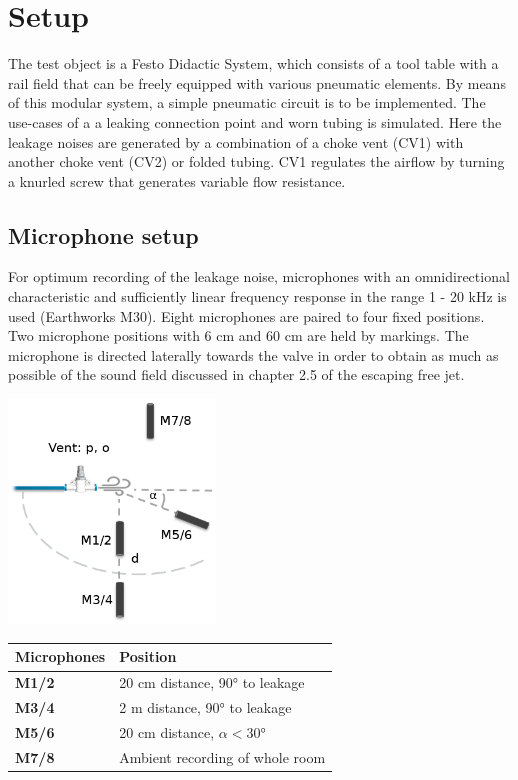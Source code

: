 \documentclass[a4paper,12pt]{article}
\begin{document}
\section{Setup}

The test object is a Festo Didactic System, which consists of a tool table with a rail field that can be freely equipped with various pneumatic elements. By means of this modular system, a simple pneumatic circuit is to be implemented. The use-cases of a a leaking connection point and worn tubing is simulated. Here the leakage noises are generated by a combination of a choke vent (CV1) with another choke vent (CV2) or folded tubing. CV1 regulates the airflow by turning a knurled screw that generates variable flow resistance. 

\subsection{Microphone setup}

For optimum recording of the leakage noise, microphones with an omnidirectional characteristic and sufficiently linear frequency response in the range 1 - 20 kHz is used (Earthworks M30). Eight microphones are paired to four fixed positions.  Two microphone positions with 6 cm and 60 cm are held by markings. The microphone is directed laterally towards the valve in order to obtain as much as possible of the sound field discussed in chapter 2.5 of the escaping free jet.

 \begin{minipage}{\textwidth}
  \begin{minipage}[b]{0.49\textwidth}
    \centering
    \includegraphics[width=55mm]{images/mic_positions_scheme.png}
  \end{minipage}
  \hfill
  \begin{minipage}[b]{0.49\textwidth}
    \centering
    \begin{tabular}{ll}
    Microphones & Position\\
    \hline
    \textbf{M1/2} & 20 cm distance, 90° to leakage\\
    \textbf{M3/4}& 2 m distance, 90° to leakage\\
    \textbf{M5/6}& 20 cm distance, $\alpha < 30°$\\
    \textbf{M7/8}   & Ambient recording of whole room   
    \label{tab:mics}
    \end{tabular}
    \end{minipage}
  \end{minipage}
\end{document}
